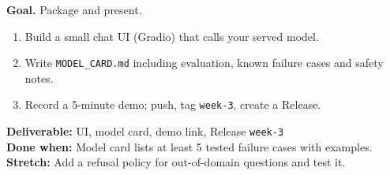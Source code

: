 \begin{tcolorbox}[enhanced,breakable,colback=white,colframe=sun,boxrule=0.8pt,arc=2pt,left=7pt,right=7pt,top=4pt,bottom=4pt,
  title={\bfseries Saturday --- Chat UI, report and model card\hfill\normalfont\small 3 h},coltitle=white,colbacktitle=sun,fonttitle=\small]
\textbf{Goal.} Package and present.
\begin{enumerate}[itemsep=1pt,topsep=2pt]
  \item Build a small chat UI (Gradio) that calls your served model.
  \item Write \texttt{MODEL\_CARD.md} including evaluation, known failure cases and safety notes.
  \item Record a 5-minute demo; push, tag \texttt{week-3}, create a Release.
\end{enumerate}
\textbf{\color{dataC}Deliverable:} UI, model card, demo link, Release \texttt{week-3}\\
\textbf{\color{navy}Done when:} Model card lists at least 5 tested failure cases with examples.\\
\textbf{\color{skillC}Stretch:} Add a refusal policy for out-of-domain questions and test it.
\end{tcolorbox}


